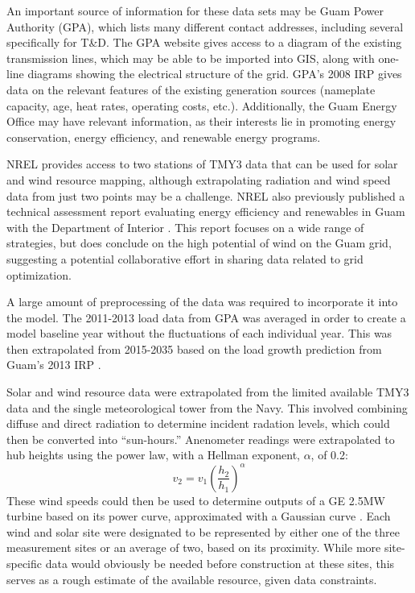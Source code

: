 \documentclass[12pt,letterpaper,fleqn]{report}
\begin{document}
An important source of information for these data sets may be Guam
Power Authority (GPA), which lists many different contact addresses,
including several specifically for T\&D. The GPA website gives access
to a diagram of the existing transmission lines, which may be able to
be imported into GIS, along with one-line diagrams showing the
electrical structure of the grid. GPA's 2008 IRP gives data on the
relevant features of the existing generation sources (nameplate
capacity, age, heat rates, operating costs, etc.). Additionally, the
Guam Energy Office may have relevant information, as their interests
lie in promoting energy conservation, energy efficiency, and renewable
energy programs.

NREL provides access to two stations of TMY3 data that can be used for
solar and wind resource mapping, although extrapolating radiation and
wind speed data from just two points may be a challenge. NREL also
previously published a technical assessment report evaluating energy
efficiency and renewables in Guam with the Department of Interior
\cite{misty}. This report focuses on a wide range of strategies, but
does conclude on the high potential of wind on the Guam grid,
suggesting a potential collaborative effort in sharing data related to
grid optimization.

A large amount of preprocessing of the data was required to
incorporate it into the model. The 2011-2013 load data from GPA was
averaged in order to create a model baseline year without the
fluctuations of each individual year. This was then extrapolated from
2015-2035 based on the load growth prediction from Guam's 2013 IRP
\cite{cruz13}. 

Solar and wind resource data were extrapolated from the limited
available TMY3 data and the single meteorological tower from the
Navy. This involved combining diffuse and direct radiation to
determine incident radation levels, which could then be converted into
``sun-hours.'' Anenometer readings were extrapolated to hub heights
using the power law, with a Hellman exponent, $\alpha$, of 0.2:
\[v_2 = v_1\left(\frac{h_2}{h_1}\right)^\alpha\] 
These wind speeds could then be used to determine outputs of a GE
2.5MW turbine based on its power curve, approximated with a Gaussian
curve \cite{ge}. Each wind and solar site were designated to be
represented by either one of the three measurement sites or an average
of two, based on its proximity. While more site-specific data would
obviously be needed before construction at these sites, this serves as
a rough estimate of the available resource, given data constraints.
\end{document}
